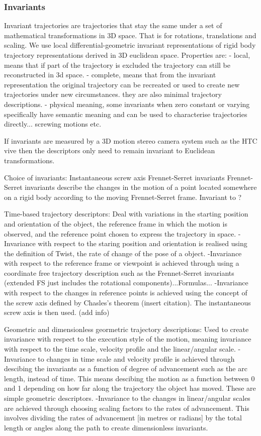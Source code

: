 \documentclass{article}
\begin{document}
\subsubsection{Invariants}
Invariant trajectories are trajectories that stay the same under a set of mathematical transformations in 3D space.
That is for rotations, translations and scaling.
We use local differential-geometric invariant representations of rigid body trajectory representations derived in 3D euclidean space. 
Properties are: 
- local, means that if part of the trajectory is excluded the trajectory can still be reconstructed in 3d space. 
- complete, means that from the invariant representation the original trajectory can be recreated or used to create new trajectories under new circumstances. they are also minimal trajectory descriptions. 
- physical meaning, some invariants when zero constant or varying specifically have semantic meaning and can be used to characterise trajectories directly... screwing motions etc.

If invariants are measured by a 3D motion stereo camera system such as the HTC vive then the descriptors only need to remain invariant to Euclidean transformations. 

Choice of invariants: 
Instantaneous screw axis 
Frennet-Serret invariants 
Frennet-Serret invariants describe the changes in the motion of a point located somewhere on a rigid body according to the moving Frennet-Serret frame. 
Invariant to ? 

Time-based trajectory descriptors: 
Deal with variations in the starting position and orientation of the object, the reference frame in which the motion is observed, and the reference point chosen to express the trajectory in space. 
-Invariance with respect to the staring position and orientation is realised using the definition of Twist, the rate of change of the pose of a object. 
-Invariance with respect to the reference frame or viewpoint is achieved through using a coordinate free trajectory description such as the Frennet-Serret invariants (extended FS just includes the rotational components)...Formulas...
-Invariance with respect to the changes in reference points is achieved using the concept of the screw axis defined by Chasles's theorem (insert citation). The instantaneous screw axis is then used. (add info) 

Geometric and dimensionless geormetric trajectory descriptions:
Used to create invariance with respect to the execution style of the motion, meaning invariance with respect to the time scale, velocity profile and the linear/angular scale.
-Invariance to changes in time scale and velocity profile is achieved through descibing the invariants as a function of degree of advancement such as the arc length, instead of time. 
This means descibing the motion as a function between 0 and 1 depending on how far along the trajectory the object has moved. These are simple geometric descriptors. 
-Invariance to the changes in linear/angular scales are achieved through choosing scaling factors to the rates of advancement. 
This involves dividing the rates of advancement [in metres or radians] by the total length or angles along the path to create dimensionless invariants. 
\end{document}

